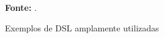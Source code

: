 \begin{figure}[h!]
\centering

\caption{\textmd{Exemplos de DSL amplamente utilizadas}}
\label{fig:exemplosdsl}

\par\medskip\textbf{Fonte:} . \par\medskip
\end{figure}
